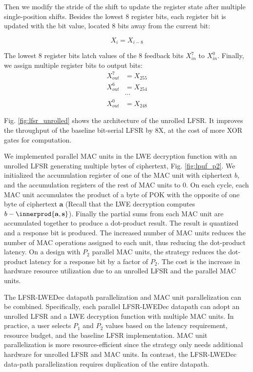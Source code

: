 Then we modify the stride of the shift to update the register state after multiple single-position shifts. Besides the lowest 8 register bits, each register bit is updated with the bit value, located 8 bits away from the current bit:

\begin{equation*}
    X_{i} = X_{i-8}
\end{equation*}

The lowest 8 register bits latch values of the 8 feedback bits $X_{in} ^ 7$ to $X_{in} ^ 0$. Finally, we assign multiple register bits to output bits:
\begin{align*}
    X_{out} ^ 7 &=  X_{255} \\
    X_{out} ^ 6 &=  X_{254}  \\
    &\cdots \\
    X_{out} ^ 0 &= X_{248} 
\end{align*}

Fig. \ref{fig:lfsr_unrolled} shows the architecture of the unrolled LFSR. It improves the throughput of the baseline bit-serial LFSR by 8X, at the cost of more XOR gates for computation.

We implemented parallel MAC units in the LWE decryption function with an unrolled LFSR generating multiple bytes of ciphertext, Fig. \ref{fig:lpuf_p2}. We initialized the accumulation register of one of the MAC unit with ciphertext $b$, and the accumulation registers of the rest of MAC units to 0. On each cycle, each MAC unit accumulates the product of a byte of POK with the opposite of one byte of ciphertext $\mathbf{a}$ (Recall that the LWE decryption computes $b-\innerprod{\mathbf{a},\mathbf{s}}$). Finally the partial sums from each MAC unit are accumulated together to produce a dot-product result. The result is quantized and a response bit is produced. The increased number of MAC units reduces the number of MAC operations assigned to each unit, thus reducing the dot-product latency. On a design with $P_2$ parallel MAC units, the strategy reduces the dot-product latency for a response bit by a factor of $P_2$. The cost is the increase in hardware resource utilization due to an unrolled LFSR and the parallel MAC units.

The LFSR-LWEDec datapath parallelization and MAC unit parallelization can be combined. Specifically, each parallel LFSR-LWEDec datapath can adopt an unrolled LFSR and a LWE decryption function with multiple MAC units. In practice, a user selects $P_1$ and $P_2$ values based on the latency requirement, resource budget, and the baseline LFSR implementation. MAC unit parallelization is more resource-efficient since the strategy only needs additional hardware for unrolled LFSR and MAC units. In contrast, the LFSR-LWEDec data-path parallelization requires duplication of the entire datapath. 

